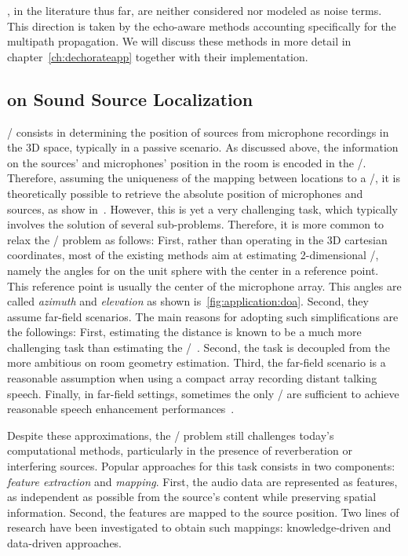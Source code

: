 , in the literature thus far, are neither considered nor modeled as noise terms.
This direction is taken by the echo-aware methods accounting specifically for the multipath propagation.
We will discuss these methods in more detail in chapter~\cref{ch:dechorateapp} together with their implementation.

\subsection{on Sound Source Localization}
\SSLdef/ consists in determining the position of sources from microphone recordings in the 3D space, typically in a passive scenario.
As discussed above, the information on the sources' and microphones' position in the room is encoded in the \RIRs/.
Therefore, assuming the uniqueness of the mapping between locations to a \RIR/, it is theoretically possible to retrieve the absolute position of microphones and sources, as show in~.
However,  this is yet a very challenging task, which typically involves the solution of several sub-problems.
Therefore, it is more common to relax the \SSL/ problem as follows:
First, rather than operating in the  3D cartesian coordinates, most of the existing methods aim at estimating 2-dimensional \DOAdef/, namely the angles for on the unit sphere with the center in a reference point.
This reference point is usually the center of the microphone array.
This angles are called \textit{azimuth} and \textit{elevation} as shown is~\cref{fig:application:doa}.
Second, they assume far-field scenarios.
The main reasons for adopting such simplifications are the followings:
First, estimating the distance is known to be a much more challenging task than estimating the \DOAs/~.
Second, the task is decoupled from the more ambitious on room geometry estimation.
Third, the far-field scenario is a reasonable assumption when using a compact array recording distant talking speech.
Finally, in far-field settings, sometimes the only \DOAs/ are sufficient to achieve reasonable speech enhancement performances~.


\mynewline
Despite these approximations, the \SSL/ problem still challenges today's computational methods, particularly in the presence of reverberation or interfering sources.
Popular approaches for this task consists in two components: \textit{feature extraction} and \textit{mapping}.
First, the audio data are represented as features, as independent as possible from the source's content while preserving spatial information.
Second, the features are mapped to the source position.
Two lines of research have been investigated to obtain such mappings: knowledge-driven and data-driven approaches.

